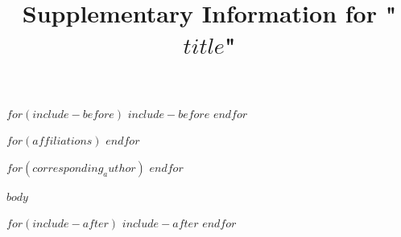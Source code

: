 \documentclass[$if(classoption)$$classoption$$else$draft,linenumbers$endif$]{agujournal2019}
\let\oldtitle\title
\renewcommand{\title}[1]{\oldtitle{#1}\thispagestyle{front}}
\begin{document}
$for(include-before)$
$include-before$
$endfor$

\title{Supplementary Information for "$title$"}


$for(affiliations)$
$endfor$

$for(corresponding_author)$
$endfor$

$body$

$for(include-after)$
$include-after$
$endfor$
\end{document}
